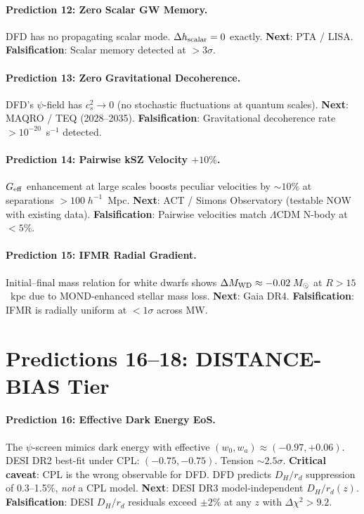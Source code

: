 \documentclass[11pt,a4paper]{article}
\newcommand{\Geff}{G_{\rm eff}}
\begin{document}
\paragraph{Prediction 12: Zero Scalar GW Memory.}
DFD has no propagating scalar mode.  $\Delta h_{\rm scalar} = 0$ exactly.
\textbf{Next}: PTA / LISA.
\textbf{Falsification}: Scalar memory detected at $> 3\sigma$.

\paragraph{Prediction 13: Zero Gravitational Decoherence.}
DFD's $\psi$-field has $c_s^2 \to 0$ (no stochastic fluctuations
at quantum scales).
\textbf{Next}: MAQRO / TEQ (2028--2035).
\textbf{Falsification}: Gravitational decoherence rate $> 10^{-20}$~s$^{-1}$
detected.

\paragraph{Prediction 14: Pairwise kSZ Velocity $+10\%$.}
$\Geff$ enhancement at large scales boosts peculiar velocities by
$\sim 10\%$ at separations $> 100\;h^{-1}$~Mpc.
\textbf{Next}: ACT / Simons Observatory (testable NOW with existing data).
\textbf{Falsification}: Pairwise velocities match $\Lambda$CDM N-body
at $< 5\%$.

\paragraph{Prediction 15: IFMR Radial Gradient.}
Initial--final mass relation for white dwarfs shows
$\Delta M_{\rm WD} \approx -0.02\;M_\odot$ at $R > 15$~kpc due to
MOND-enhanced stellar mass loss.
\textbf{Next}: Gaia DR4.
\textbf{Falsification}: IFMR is radially uniform at $< 1\sigma$
across MW.


\section{Predictions 16--18: DISTANCE-BIAS Tier}

\paragraph{Prediction 16: Effective Dark Energy EoS.}
The $\psi$-screen mimics dark energy with effective
$(w_0, w_a) \approx (-0.97, +0.06)$.  DESI DR2 best-fit under CPL:
$(-0.75, -0.75)$.  Tension $\sim 2.5\sigma$.
\textbf{Critical caveat}: CPL is the wrong observable for DFD.  DFD
predicts $D_H/r_d$ suppression of 0.3--1.5\%, \emph{not} a CPL model.
\textbf{Next}: DESI DR3 model-independent $D_H/r_d(z)$.
\textbf{Falsification}: DESI $D_H/r_d$ residuals exceed
$\pm 2\%$ at any $z$ with $\Delta\chi^2 > 9.2$.
\end{document}
